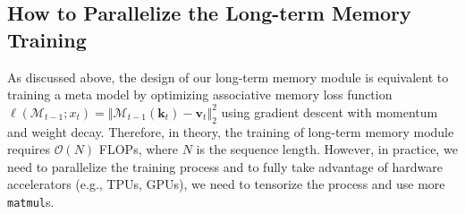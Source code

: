 \documentclass{article}
\newcommand{\M}[0]{\mathcal{M}}
\begin{document}
\subsection{How to Parallelize the Long-term Memory Training}\label{sec:fast-training} 
As discussed above, the design of our long-term memory module is equivalent to training a meta model by optimizing associative memory loss function $\ell(\M_{t-1}; x_t) =\left \Vert \M_{t-1}\left(\mathbf{k}_t\right) - \mathbf{v}_t  \right \Vert_2^2$ using gradient descent with momentum and weight decay. Therefore, in theory, the training of long-term memory module requires $\mathcal{O}\left(N\right)$ FLOPs, where $N$ is the sequence length. However, in practice, we need to parallelize the training process and to fully take advantage of hardware accelerators (e.g., TPUs, GPUs), we need to tensorize the process and use more \texttt{matmul}s. 
\end{document}
